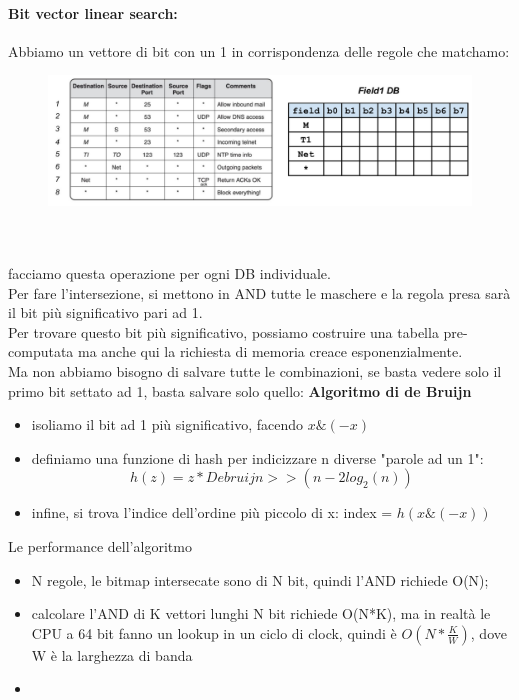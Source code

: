 \documentclass[12pt, oneside]{extbook} %
\begin{document}
\paragraph{Bit vector linear search:} Abbiamo un vettore di bit con un 1 in corrispondenza delle regole che matchamo:\\
\begin{figure}[h!]
    \centering
    \includegraphics[scale=0.5]{../../immagini/bvls}
\end{figure}\\\\
facciamo questa operazione per ogni DB individuale.
\\Per fare l'intersezione, si mettono in AND tutte le maschere e la regola presa sarà il bit più significativo pari ad 1.
\\Per trovare questo bit più significativo, possiamo costruire una tabella pre-computata ma anche qui la richiesta di memoria creace esponenzialmente.
\\Ma non abbiamo bisogno di salvare tutte le combinazioni, se basta vedere solo il primo bit settato ad 1, basta salvare solo quello: \textbf{Algoritmo di de Bruijn}
\begin{itemize}
\item isoliamo il bit ad 1 più significativo, facendo $x \& (-x)$
\item definiamo una funzione di hash per indicizzare n diverse "parole ad un 1":
    \begin{equation}
        h(z) = z * Debruijn >> (n - 2log_2(n))
    \end{equation}
\item infine, si trova l'indice dell'ordine più piccolo di x: index = $h(x \& (-x))$
\end{itemize}
Le performance dell'algoritmo
\begin{itemize}
\item N regole, le bitmap intersecate sono di N bit, quindi l'AND richiede O(N);
\item calcolare l'AND di K vettori lunghi N bit richiede O(N*K), ma in realtà le CPU a 64 bit fanno un lookup in un ciclo di clock, quindi è $O(N*\frac{K}{W})$, dove W è la larghezza di banda
\item 
\end{itemize}
\end{document}
